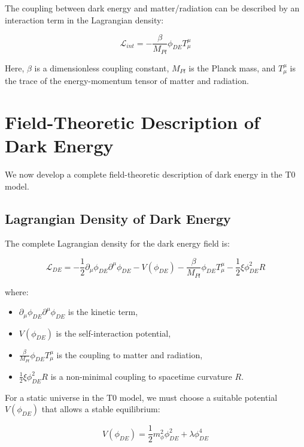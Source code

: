 \documentclass[a4paper,12pt]{article}
\theoremstyle{definition}
\theoremstyle{remark}
\begin{document}
	The coupling between dark energy and matter/radiation can be described by an interaction term in the Lagrangian density:
	
	\begin{equation}
		\mathcal{L}_{int} = -\frac{\beta}{M_{Pl}} \phi_{DE} T^{\mu}_{\mu}
	\end{equation}
	
	Here, $\beta$ is a dimensionless coupling constant, $M_{Pl}$ is the Planck mass, and $T^{\mu}_{\mu}$ is the trace of the energy-momentum tensor of matter and radiation.
	
	\section{Field-Theoretic Description of Dark Energy}
	We now develop a complete field-theoretic description of dark energy in the T0 model.
	
	\subsection{Lagrangian Density of Dark Energy}
	The complete Lagrangian density for the dark energy field is:
	
	\begin{equation}
		\mathcal{L}_{DE} = -\frac{1}{2}\partial_\mu \phi_{DE} \partial^\mu \phi_{DE} - V(\phi_{DE}) - \frac{\beta}{M_{Pl}} \phi_{DE} T^{\mu}_{\mu} - \frac{1}{2}\xi \phi_{DE}^2 R
	\end{equation}
	
	where:
	\begin{itemize}
		\item $\partial_\mu \phi_{DE} \partial^\mu \phi_{DE}$ is the kinetic term,
		\item $V(\phi_{DE})$ is the self-interaction potential,
		\item $\frac{\beta}{M_{Pl}} \phi_{DE} T^{\mu}_{\mu}$ is the coupling to matter and radiation,
		\item $\frac{1}{2}\xi \phi_{DE}^2 R$ is a non-minimal coupling to spacetime curvature $R$.
	\end{itemize}
	
	For a static universe in the T0 model, we must choose a suitable potential $V(\phi_{DE})$ that allows a stable equilibrium:
	
	\begin{equation}
		V(\phi_{DE}) = \frac{1}{2}m_{\phi}^2\phi_{DE}^2 + \lambda \phi_{DE}^4
	\end{equation}
	
\end{document}
